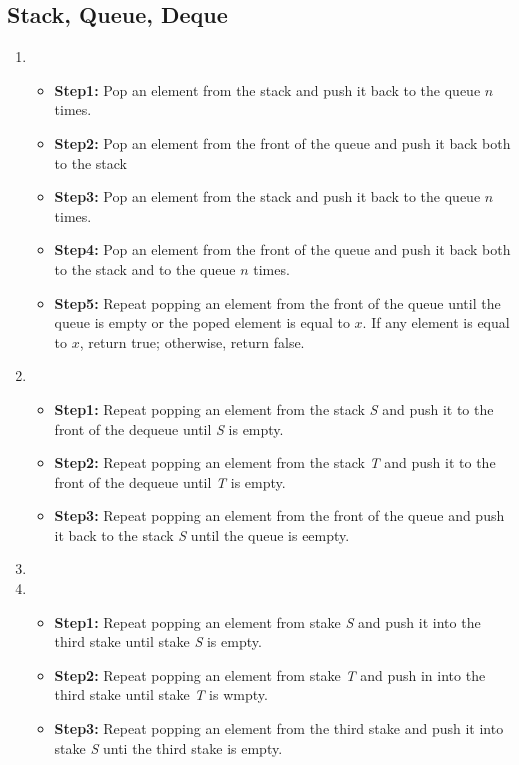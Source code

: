 \documentclass[fleqn,a4paper,12pt]{article}
\begin{document}
\subsection{Stack, Queue, Deque}
\begin{enumerate}
\item
  \begin{itemize}
  \item 
    \textbf{Step1: }Pop an element from the stack and push it back to the queue $n$ times.
  \item
    \textbf{Step2: }Pop an element from the front of the queue and push it back both to the stack
  \item
    \textbf{Step3: }Pop an element from the stack and push it back to the queue $n$ times.
  \item
    \textbf{Step4: }Pop an element from the front of the queue and push it back both to the stack and to the queue $n$ times. 
  \item
    \textbf{Step5: }Repeat popping an element from the front of the queue until the queue is empty or the poped element is equal to $x$. If any element is equal to $x$, return true; otherwise, return false.
  \end{itemize}

\item
  \begin{itemize}
  \item 
    \textbf{Step1: }Repeat popping an element from the stack \textit{S} and push it to the front of the dequeue until \textit{S} is empty.
  \item
    \textbf{Step2: }Repeat popping an element from the stack \textit{T} and push it to the front of the dequeue until \textit{T} is empty.
  \item
    \textbf{Step3: }Repeat popping an element from the front of the queue and push it back to the stack \textit{S} until the queue is eempty.
  \end{itemize}
  
\item
\item
  \begin{itemize}
    \item
      \textbf{Step1: }Repeat popping an element from stake \textit{S} and push it into the third stake until stake \textit{S} is empty.
    \item
      \textbf{Step2: }Repeat popping an element from stake \textit{T} and push in into the third stake until stake \textit{T} is wmpty.
    \item
      \textbf{Step3: }Repeat popping an element from the third stake and push it into stake \textit{S} unti the third stake is empty.
    \end{itemize}
\end{enumerate}
\end{document}
